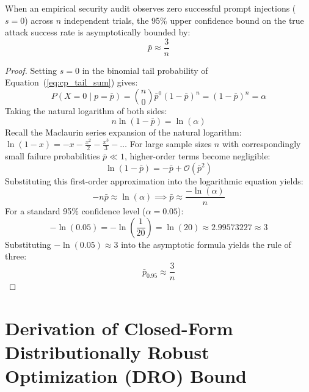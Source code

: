\begin{corollary}
When an empirical security audit observes zero successful prompt injections ($s = 0$) across $n$ independent trials, the 95\% upper confidence bound on the true attack success rate is asymptotically bounded by:
\begin{equation}
    \bar{p} \approx \frac{3}{n}
\end{equation}
\end{corollary}

\begin{proof}
Setting $s = 0$ in the binomial tail probability of Equation~(\ref{eq:cp_tail_sum}) gives:
\begin{equation}
    P(X = 0 \mid p = \bar{p}) = \binom{n}{0} \bar{p}^0 (1 - \bar{p})^n = (1 - \bar{p})^n = \alpha
\end{equation}
Taking the natural logarithm of both sides:
\begin{equation}
    n \ln(1 - \bar{p}) = \ln(\alpha)
\end{equation}
Recall the Maclaurin series expansion of the natural logarithm: $\ln(1 - x) = -x - \frac{x^2}{2} - \frac{x^3}{3} - \dots$ For large sample sizes $n$ with correspondingly small failure probabilities $\bar{p} \ll 1$, higher-order terms become negligible:
\begin{equation}
    \ln(1 - \bar{p}) = -\bar{p} + \mathcal{O}(\bar{p}^2)
\end{equation}
Substituting this first-order approximation into the logarithmic equation yields:
\begin{equation}
    -n \bar{p} \approx \ln(\alpha) \implies \bar{p} \approx \frac{-\ln(\alpha)}{n}
\end{equation}
For a standard 95\% confidence level ($\alpha = 0.05$):
\begin{equation}
    -\ln(0.05) = -\ln\left(\frac{1}{20}\right) = \ln(20) \approx 2.99573227 \approx 3
\end{equation}
Substituting $-\ln(0.05) \approx 3$ into the asymptotic formula yields the rule of three:
\begin{equation}
    \bar{p}_{0.95} \approx \frac{3}{n}
\end{equation}
\end{proof}

\section{Derivation of Closed-Form Distributionally Robust Optimization (DRO) Bound}
\label{app:proof_dro}

